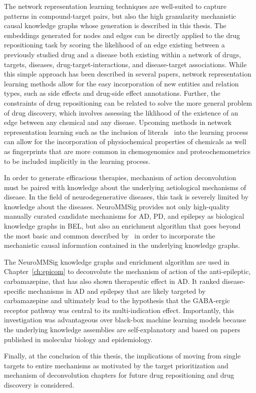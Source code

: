 The network representation learning techniques are well-suited to capture patterns in compound-target pairs, but also the high granularity mechanistic causal knowledge graphs whose generation is described in this thesis.
The embeddings generated for nodes and edges can be directly applied to the drug repositioning task by scoring the likelihood of an edge existing between a previously studied drug and a disease both existing within a network of drugs, targets, diseases, drug-target-interactions, and disease-target associations.
While this simple approach has been described in several papers, network representation learning methods allow for the easy incorporation of new entities and relation types, such as side effects and drug-side effect annotations.
Further, the constraints of drug repositioning can be related to solve the more general problem of drug discovery, which involves assessing the liklihood of the existence of an edge between any chemical and any disease.
Upcoming methods in network representation learning such as the inclusion of literals~\cite{Kristiadi2018} into the learning process can allow for the incorporation of physiochemical properties of chemicals as well as fingerprints that are more common in chemogenomics and proteochemometrics to be included implicitly in the learning process.

In order to generate efficacious therapies, mechanism of action deconvolution must be paired with knowledge about the underlying aetiological mechanisms of disease.
In the field of neurodegenerative diseases, this task is severely limited by knowledge about the diseases.
NeuroMMSig provides not only high-quality manually curated candidate mechanisms for \ac{AD}, \ac{PD}, and epilepsy as biological knowledge graphs in \ac{BEL}, but also an enrichment algorithm that goes beyond the most basic and common described by~\cite{Khatri2012} in order to incorporate the mechanistic causal information contained in the underlying knowledge graphs.

The NeuroMMSig knowledge graphs and enrichment algorithm are used in Chapter~\ref{ch:epicom} to deconvolute the mechanism of action of the anti-epileptic, carbamazepine, that has also shown therapeutic effect in \ac{AD}.
It ranked disease-specific mechanisms in \ac{AD} and epilepsy that are likely targeted by carbamazepine and ultimately lead to the hypothesis that the GABA-ergic receptor pathway was central to its multi-indication effect.
Importantly, this investigation was advantageous over black-box machine learning models because the underlying knowledge assemblies are self-explanatory and based on papers published in molecular biology and epidemiology.

Finally, at the conclusion of this thesis, the implications of moving from single targets to entire mechanisms as motivated by the target prioritization and mechanism of deconvolution chapters for future drug repositioning and drug discovery is considered.
